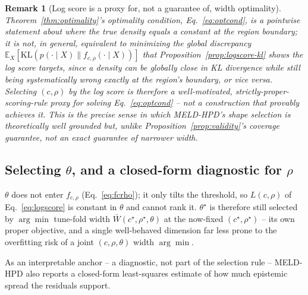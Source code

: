 \documentclass[10pt,twocolumn,a4paper]{article}
\newtheorem{remark}{Remark}
\begin{document}
\begin{remark}[Log score is a proxy for, not a guarantee of, width optimality]
\label{rem:logscoreproxy}
Theorem~\ref{thm:optimality}'s optimality condition, Eq.~\eqref{eq:optcond}, is a \emph{pointwise}
statement about where the true density equals a constant at the region boundary; it is not, in
general, equivalent to minimizing the \emph{global} discrepancy
$\mathbb E_X[\mathrm{KL}(p(\cdot\mid X)\|f_{c,\rho}(\cdot\mid X))]$ that
Proposition~\ref{prop:logscore-kl} shows the log score targets, since a density can be globally close
in KL divergence while still being systematically wrong exactly at the region's boundary, or vice
versa. Selecting $(c,\rho)$ by the log score is therefore a well-motivated, strictly-proper-scoring-rule
proxy for solving Eq.~\eqref{eq:optcond} -- not a construction that provably achieves it. This is the
precise sense in which MELD-HPD's shape selection is theoretically well grounded but, unlike
Proposition~\ref{prop:validity}'s coverage guarantee, not an exact guarantee of narrower width.
\end{remark}

\subsection{Selecting $\theta$, and a closed-form diagnostic for $\rho$}
$\theta$ does not enter $f_{c,\rho}$ (Eq.~\eqref{eq:fcrho}); it only tilts the threshold, so
$L(c,\rho)$ of Eq.~\eqref{eq:logscore} is constant in $\theta$ and cannot rank it. $\theta^\star$ is
therefore still selected by $\arg\min$ tune-fold width $\bar W(c^\star,\rho^\star,\theta)$ at the
now-fixed $(c^\star,\rho^\star)$ -- its own proper objective, and a single well-behaved dimension far
less prone to the overfitting risk of a joint $(c,\rho,\theta)$ width $\arg\min$.

As an interpretable anchor -- a diagnostic, not part of the selection rule -- MELD-HPD also reports a
closed-form least-squares estimate of how much epistemic spread the residuals support.
\end{document}
